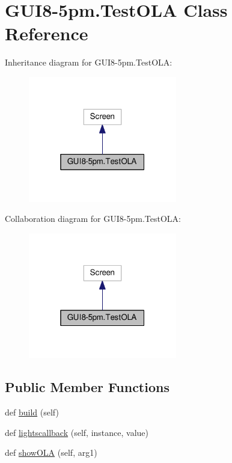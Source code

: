 \hypertarget{classGUI8-5pm_1_1TestOLA}{}\section{G\+U\+I8-\/5pm.Test\+O\+LA Class Reference}
\label{classGUI8-5pm_1_1TestOLA}


Inheritance diagram for G\+U\+I8-\/5pm.Test\+O\+LA\+:
\nopagebreak
\begin{figure}[H]
\begin{center}
\leavevmode
\includegraphics[width=184pt]{classGUI8-5pm_1_1TestOLA__inherit__graph}
\end{center}
\end{figure}


Collaboration diagram for G\+U\+I8-\/5pm.Test\+O\+LA\+:
\nopagebreak
\begin{figure}[H]
\begin{center}
\leavevmode
\includegraphics[width=184pt]{classGUI8-5pm_1_1TestOLA__coll__graph}
\end{center}
\end{figure}
\subsection*{Public Member Functions}
\begin{DoxyCompactItemize}
\item 
def \hyperlink{classGUI8-5pm_1_1TestOLA_a3dce3cf723de3b14a4479fc83e9502bc}{build} (self)
\item 
def \hyperlink{classGUI8-5pm_1_1TestOLA_af8d2acfcff4dc415a2fc5c9a60196132}{lightscallback} (self, instance, value)
\item 
def \hyperlink{classGUI8-5pm_1_1TestOLA_ad8b9a596b77b2aaad929c7ff2e34a6cd}{show\+O\+LA} (self, arg1)
\end{DoxyCompactItemize}
